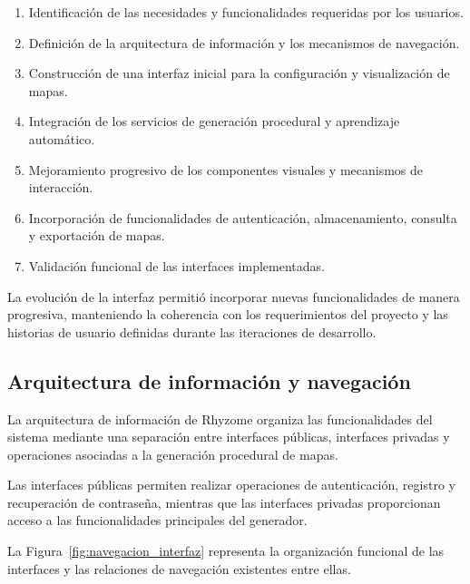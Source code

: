 \begin{enumerate}
	
	\item Identificación de las necesidades y funcionalidades requeridas por los usuarios.
	
	\item Definición de la arquitectura de información y los mecanismos de navegación.
	
	\item Construcción de una interfaz inicial para la configuración y visualización de mapas.
	
	\item Integración de los servicios de generación procedural y aprendizaje automático.
	
	\item Mejoramiento progresivo de los componentes visuales y mecanismos de interacción.
	
	\item Incorporación de funcionalidades de autenticación, almacenamiento, consulta y exportación de mapas.
	
	\item Validación funcional de las interfaces implementadas.
	
\end{enumerate}

La evolución de la interfaz permitió incorporar nuevas funcionalidades de manera progresiva, manteniendo la coherencia con los requerimientos del proyecto y las historias de usuario definidas durante las iteraciones de desarrollo.

\subsection{Arquitectura de información y navegación}

La arquitectura de información de Rhyzome organiza las funcionalidades del sistema mediante una separación entre interfaces públicas, interfaces privadas y operaciones asociadas a la generación procedural de mapas.

Las interfaces públicas permiten realizar operaciones de autenticación, registro y recuperación de contraseña, mientras que las interfaces privadas proporcionan acceso a las funcionalidades principales del generador.

La Figura~\ref{fig:navegacion_interfaz} representa la organización funcional de las interfaces y las relaciones de navegación existentes entre ellas.

